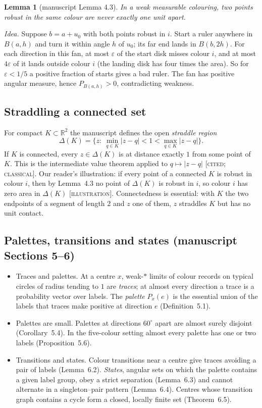 \documentclass[11pt]{article}
\newtheorem{lemma}[theorem]{Lemma}
\theoremstyle{definition}
\theoremstyle{remark}
\newcommand{\R}{\mathbb{R}}
\newcommand{\st}[1]{\textsc{[#1]}}
\begin{document}
\begin{lemma}[manuscript Lemma 4.3]
In a weak measurable colouring, two points robust in the same colour are never exactly one unit apart.
\end{lemma}
\noindent\emph{Idea.} Suppose $b=a+u_0$ with both points robust in $i$. Start a ruler anywhere in $B(a,h)$ and turn it within angle $h$ of $u_0$; its far end lands in $B(b,2h)$. For each direction in this fan, at most $\varepsilon$ of the start disk misses colour $i$, and at most $4\varepsilon$ of it lands outside colour $i$ (the landing disk has four times the area). So for $\varepsilon<1/5$ a positive fraction of starts gives a bad ruler. The fan has positive angular measure, hence $P_{B(a,h)}>0$, contradicting weakness.

\subsection{Straddling a connected set}
For compact $K\subset\R^2$ the manuscript defines the open \emph{straddle region}
\[
\Delta(K)=\{z:\ \min_{q\in K}|z-q|<1<\max_{q\in K}|z-q|\}.
\]
If $K$ is connected, every $z\in\Delta(K)$ is at distance exactly $1$ from some point of $K$. This is the intermediate value theorem applied to $q\mapsto|z-q|$ \st{cited; classical}. Our reader's illustration: if every point of a connected $K$ is robust in colour $i$, then by Lemma~4.3 no point of $\Delta(K)$ is robust in $i$, so colour $i$ has zero area in $\Delta(K)$ \st{illustration}. Connectedness is essential: with $K$ the two endpoints of a segment of length 2 and $z$ one of them, $z$ straddles $K$ but has no unit contact.

\subsection{Palettes, transitions and states (manuscript Sections 5--6)}
\begin{itemize}
\item Traces and palettes. At a centre $x$, weak-$*$ limits of colour records on typical circles of radius tending to $1$ are \emph{traces}; at almost every direction a trace is a probability vector over labels. The \emph{palette} $P_x(e)$ is the essential union of the labels that traces make positive at direction $e$ (Definition~5.1).
\item Palettes are small. Palettes at directions $60^\circ$ apart are almost surely disjoint (Corollary~5.4). In the five-colour setting almost every palette has one or two labels (Proposition~5.6).
\item Transitions and states. Colour transitions near a centre give traces avoiding a pair of labels (Lemma~6.2). \emph{States}, angular sets on which the palette contains a given label group, obey a strict separation (Lemma~6.3) and cannot alternate in a singleton--pair pattern (Lemma~6.4). Centres whose transition graph contains a cycle form a closed, locally finite set (Theorem~6.5).
\end{itemize}
\end{document}
